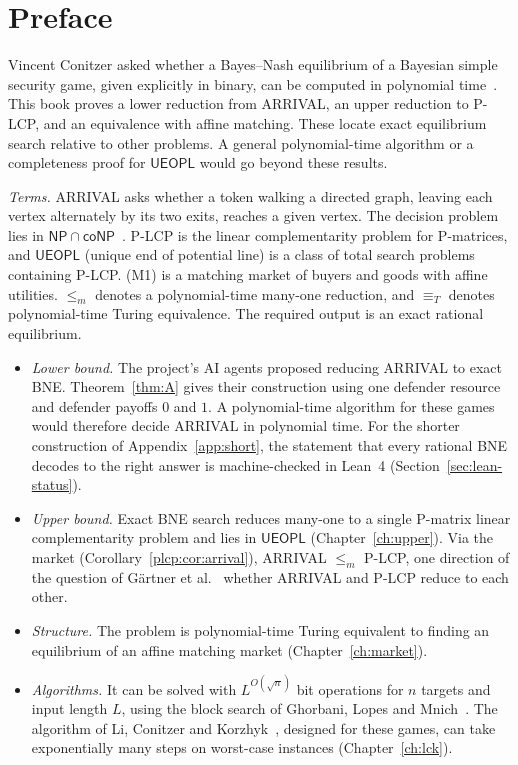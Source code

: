 \chapter*{Preface}

Vincent Conitzer asked whether a Bayes--Nash equilibrium of a Bayesian simple security game, given
explicitly in binary, can be computed in polynomial time~\cite{conitzer26}.
This book proves a lower reduction from ARRIVAL, an upper reduction to
P-LCP, and an equivalence with affine matching. These locate exact equilibrium
search relative to other problems. A general polynomial-time algorithm
or a completeness proof for $\mathsf{UEOPL}$ would go beyond these results.

\emph{Terms.} ARRIVAL asks whether a token walking a directed graph,
leaving each vertex alternately by its two exits, reaches a given vertex.
The decision problem lies in $\mathsf{NP}\cap\mathsf{coNP}$~\cite{dgkmw17}.
P-LCP is the linear complementarity problem for P-matrices, and
$\mathsf{UEOPL}$ (unique end of potential line) is a class of total
search problems containing P-LCP. (M1) is a matching market of buyers
and goods with affine utilities. $\le_m$ denotes a polynomial-time many-one
reduction, and $\equiv_T$ denotes polynomial-time Turing equivalence.
The required output is an exact rational equilibrium.
\begin{itemize}[nosep]
\item \emph{Lower bound.} The project's AI agents proposed reducing ARRIVAL to exact BNE.
Theorem~\ref{thm:A} gives their construction using one defender resource and defender payoffs
$0$ and $1$. A polynomial-time algorithm for these games would therefore decide ARRIVAL in
polynomial time. For the shorter construction of Appendix~\ref{app:short}, the statement
that every rational BNE decodes to the right answer is machine-checked in Lean~4
(Section~\ref{sec:lean-status}).
\item \emph{Upper bound.} Exact BNE search reduces many-one to a single P-matrix linear
complementarity problem and lies in $\mathsf{UEOPL}$
(Chapter~\ref{ch:upper}). Via the market (Corollary~\ref{plcp:cor:arrival}), ARRIVAL $\le_m$ P-LCP, one direction of the question of G\"artner et al.~\cite{ghhkms18} whether ARRIVAL and P-LCP reduce to each other.
\item \emph{Structure.} The problem is polynomial-time Turing equivalent to finding an equilibrium of
an affine matching market (Chapter~\ref{ch:market}).
\item \emph{Algorithms.} It can be solved with $L^{O(\sqrt n)}$ bit operations for $n$ targets and
input length $L$, using the block search of Ghorbani, Lopes and Mnich~\cite{glm26}. The algorithm of Li, Conitzer and Korzhyk~\cite{lck16}, designed for these games, can take exponentially many steps on worst-case instances
(Chapter~\ref{ch:lck}).
\end{itemize}
